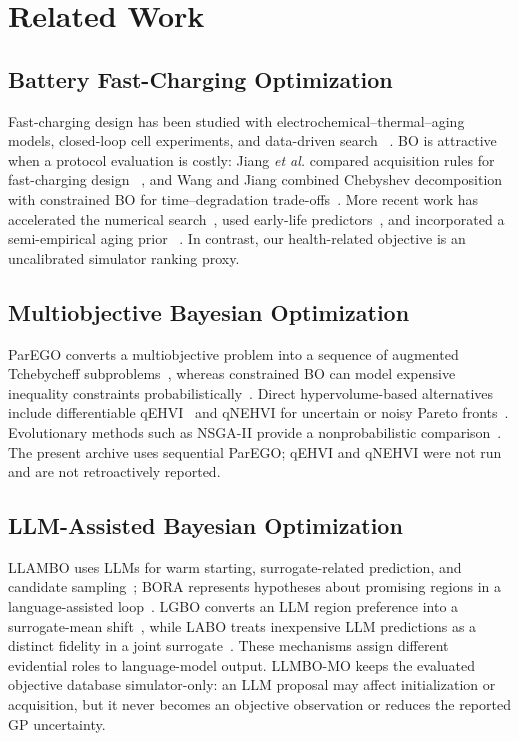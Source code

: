 \section{Related Work}
\label{sec:related}

\subsection{Battery Fast-Charging Optimization}

Fast-charging design has been studied with electrochemical--thermal--aging
models, closed-loop cell experiments, and data-driven search
~\cite{ref2,ref3,ref15}. BO is attractive when a protocol evaluation is costly:
Jiang \textit{et al.} compared acquisition rules for fast-charging design
~\cite{ref7}, and Wang and Jiang combined Chebyshev decomposition with
constrained BO for time--degradation trade-offs~\cite{ref8}. More recent work
has accelerated the numerical search~\cite{ref19}, used early-life
predictors~\cite{ref18}, and incorporated a semi-empirical aging prior
~\cite{ref31}. In contrast, our health-related objective is an uncalibrated
simulator ranking proxy.

\subsection{Multiobjective Bayesian Optimization}

ParEGO converts a multiobjective problem into a sequence of augmented
Tchebycheff subproblems~\cite{ref5}, whereas constrained BO can model expensive
inequality constraints probabilistically~\cite{ref26}. Direct
hypervolume-based alternatives include differentiable qEHVI~\cite{ref27} and
qNEHVI for uncertain or noisy Pareto fronts~\cite{ref28}. Evolutionary methods
such as NSGA-II provide a nonprobabilistic comparison~\cite{ref6}. The present
archive uses sequential ParEGO; qEHVI and qNEHVI were not run and are not
retroactively reported.

\subsection{LLM-Assisted Bayesian Optimization}

LLAMBO uses LLMs for warm starting, surrogate-related prediction, and candidate
sampling~\cite{ref9}; BORA represents hypotheses about promising regions in a
language-assisted loop~\cite{ref10}. LGBO converts an LLM region preference
into a surrogate-mean shift~\cite{ref17}, while LABO treats inexpensive LLM
predictions as a distinct fidelity in a joint surrogate~\cite{ref30}. These
mechanisms assign different evidential roles to language-model output. LLMBO-MO
keeps the evaluated objective database simulator-only: an LLM proposal may
affect initialization or acquisition, but it never becomes an objective
observation or reduces the reported GP uncertainty.

